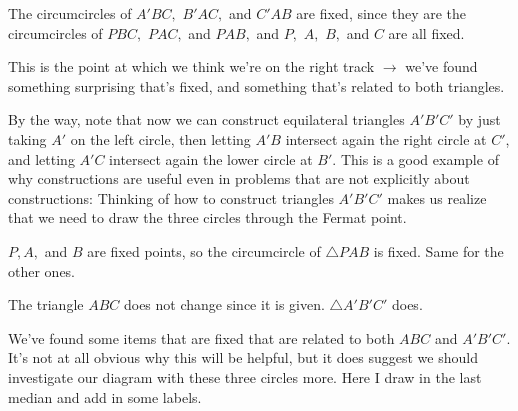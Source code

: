 
The circumcircles of $A'BC,$ $B'AC,$ and $C'AB$ are fixed, since they are the circumcircles of $PBC,$ $PAC,$ and $PAB,$ and $P,$ $A,$ $B,$ and $C$ are all fixed.

This is the point at which we think we're on the right track $\rightarrow$  we've found something surprising that's fixed, and something that's related to both triangles.

By the way, note that now we can construct equilateral triangles $A'B'C'$ by just taking $A'$ on the left circle, then letting $A'B$ intersect again the right circle at $C'$, and letting $A'C$ intersect again the lower circle at $B'$. This is a good example of why constructions are useful even in problems that are not explicitly about constructions: Thinking of how to construct triangles $A'B'C'$ makes us realize that we need to draw the three circles through the Fermat point.


$P, A,$ and $B$ are fixed points, so the circumcircle of $\triangle PAB$ is fixed. Same for the other ones.


The triangle $ABC$ does not change since it is given. $\triangle A'B'C'$ does.

We've found some items that are fixed that are related to both $ABC$ and $A'B'C'.$ It's not at all obvious why this will be helpful, but it does suggest we should investigate our diagram with these three circles more. Here I draw in the last median and add in some labels.




